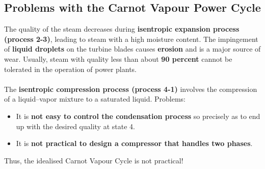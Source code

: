 \documentclass[class=report, crop=false, 12pt,a4paper]{standalone}
\numberwithin{equation}{section}
\begin{document}
\subsection{Problems with the Carnot Vapour Power Cycle}
The quality of the steam decreases during \textbf{isentropic expansion process (process 2-3)}, leading to steam with a high moisture content. The impingement of \textbf{liquid droplets} on the turbine blades causes \textbf{erosion} and is a major source of wear. Usually, steam with quality less than about \textbf{90 percent} cannot be tolerated in the operation of power plants. \\\\
The \textbf{isentropic compression process (process 4-1)} involves the compression of a liquid–vapor mixture to a saturated liquid. Problems:
\begin{itemize}[noitemsep]
  \item It is \textbf{not easy to control the condensation process} so precisely as to end up with the desired quality at state 4.
  \item It is \textbf{not practical to design a compressor that handles two phases}.
\end{itemize}
Thus, the idealised Carnot Vapour Cycle is not practical!
\end{document}
